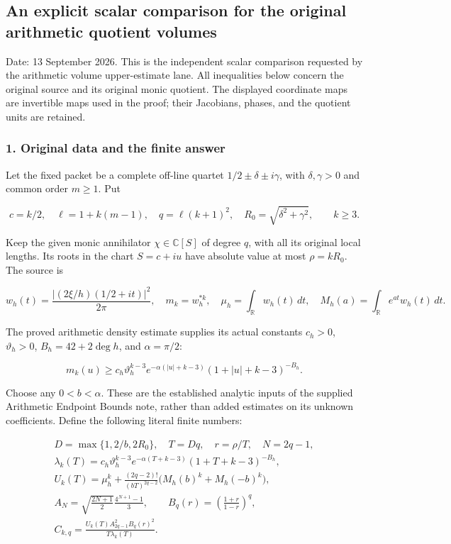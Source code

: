 \subsection{An explicit scalar comparison for the original arithmetic quotient volumes}\label{endpoint-volume_connection_original--an-explicit-scalar-comparison-for-the-original-arithmetic-quotient-volumes}

Date: 13 September 2026. This is the independent scalar comparison requested by the arithmetic volume upper-estimate lane. All inequalities below concern the original source and its original monic quotient. The displayed coordinate maps are invertible maps used in the proof; their Jacobians, phases, and the quotient units are retained.

\subsubsection{1. Original data and the finite answer}\label{endpoint-volume_connection_original--original-data-and-the-finite-answer}

Let the fixed packet be a complete off-line quartet \(1/2\pm\delta\pm i\gamma\), with \(\delta,\gamma>0\) and common order \(m\ge1\). Put

\[
 c=k/2,\quad \ell=1+k(m-1),\quad q=\ell(k+1)^2,\quad
 R_0=\sqrt{\delta^2+\gamma^2},\qquad k\ge3.
\tag{VC.1}
\]

Keep the given monic annihilator \(\chi\in\mathbb C[S]\) of degree \(q\), with all its original local lengths. Its roots in the chart \(S=c+iu\) have absolute value at most \(\rho=kR_0\). The source is

\[
 w_h(t)=\frac{|(2\xi/h)(1/2+it)|^2}{2\pi},\quad
 m_k=w_h^{*k},\quad
 \mu_h=\int_{\mathbb R}w_h(t)\,dt,\quad
 M_h(a)=\int_{\mathbb R}e^{at}w_h(t)\,dt.
\tag{VC.2}
\]

The proved arithmetic density estimate supplies its actual constants \(c_h>0\), \(\vartheta_h>0\), \(B_h=42+2\deg h\), and \(\alpha=\pi/2\):

\[
 m_k(u)\ge c_h\vartheta_h^{k-3}
 e^{-\alpha(|u|+k-3)}(1+|u|+k-3)^{-B_h}.
\tag{VC.3}
\]

Choose any \(0<b<\alpha\). These are the established analytic inputs of the supplied Arithmetic Endpoint Bounds note, rather than added estimates on its unknown coefficients. Define the following literal finite numbers:

\[
\begin{gathered}
 D=\max\{1,2/b,2R_0\},\quad T=Dq,\quad r=\rho/T,\quad N=2q-1,\\
 \lambda_k(T)=c_h\vartheta_h^{k-3}e^{-\alpha(T+k-3)}
                   (1+T+k-3)^{-B_h},\\
 U_k(T)=\mu_h^k+
 \frac{(2q-2)!}{(bT)^{2q-2}}
              \bigl(M_h(b)^k+M_h(-b)^k\bigr),\\
 A_N=\sqrt{\frac{2N+1}{2}}\frac{4^{N+1}-1}{3},
 \qquad B_q(r)=\left(\frac{1+r}{1-r}\right)^q,\\
 C_{k,q}=\frac{U_k(T)A_{2q-1}^{2}B_q(r)^2}{T\lambda_k(T)}.
\end{gathered}
\tag{VC.4}
\]

